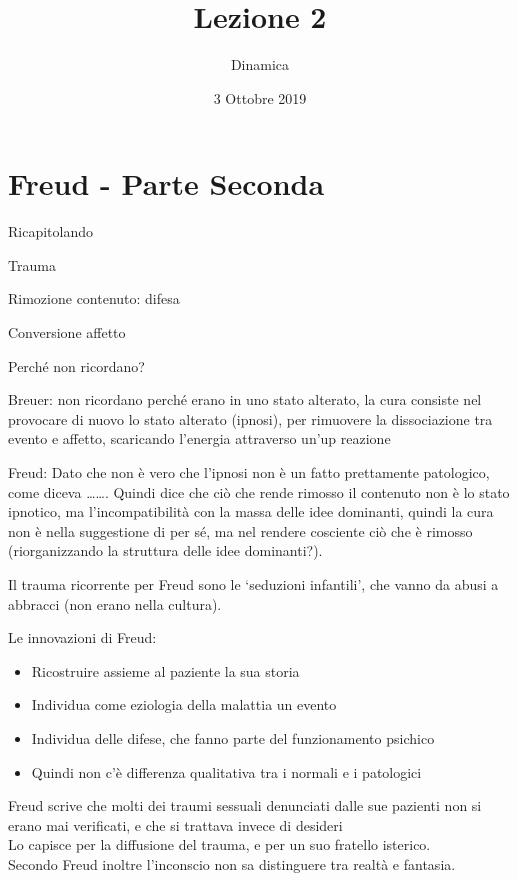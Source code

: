 \documentclass[
]{article}
\date{3 Ottobre 2019}
\title{Lezione 2}
\author{Dinamica}
\providecommand{\tightlist}{%
  \setlength{\itemsep}{0pt}\setlength{\parskip}{0pt}}
\begin{document}
\maketitle

\section{Freud - Parte Seconda}

Ricapitolando

Trauma

Rimozione contenuto: difesa

Conversione affetto

Perché non ricordano?

Breuer: non ricordano perché erano in uno stato alterato, la cura
consiste nel provocare di nuovo lo stato alterato (ipnosi), per
rimuovere la dissociazione tra evento e affetto, scaricando l'energia
attraverso un'up reazione

Freud: Dato che non è vero che l'ipnosi non è un fatto prettamente
patologico, come diceva \ldots\ldots. Quindi dice che ciò che rende
rimosso il contenuto non è lo stato ipnotico, ma l'incompatibilità con
la massa delle idee dominanti, quindi la cura non è nella suggestione di
per sé, ma nel rendere cosciente ciò che è rimosso (riorganizzando la
struttura delle idee dominanti?).

Il trauma ricorrente per Freud sono le `seduzioni infantili', che vanno
da abusi a abbracci (non erano nella cultura).

Le innovazioni di Freud:

\begin{itemize}
\tightlist
\item
  Ricostruire assieme al paziente la sua storia
\item
  Individua come eziologia della malattia un evento
\item
  Individua delle difese, che fanno parte del funzionamento psichico
\item
  Quindi non c'è differenza qualitativa tra i normali e i patologici
\end{itemize}

Freud scrive che molti dei traumi sessuali denunciati dalle sue pazienti
non si erano mai verificati, e che si trattava invece di desideri\\
Lo capisce per la diffusione del trauma, e per un suo fratello
isterico.\\
Secondo Freud inoltre l'inconscio non sa distinguere tra realtà e
fantasia.
\end{document}
